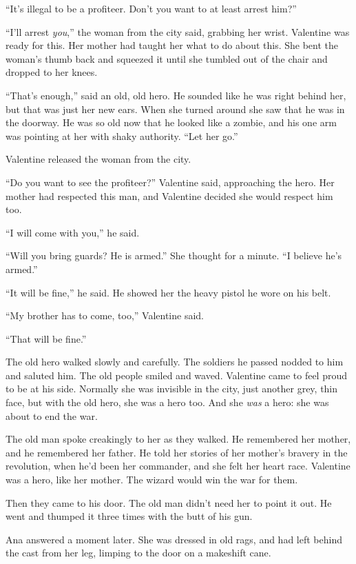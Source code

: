 “It’s illegal to be a profiteer. Don’t you want to at least arrest
him?”

“I’ll arrest \emph{you},” the woman from the city said, grabbing
her wrist. Valentine was ready for this. Her mother had taught her
what to do about this. She bent the woman’s thumb back and squeezed
it until she tumbled out of the chair and dropped to her knees.

“That’s enough,” said an old, old hero. He sounded like he was
right behind her, but that was just her new ears. When she turned
around she saw that he was in the doorway. He was so old now that
he looked like a zombie, and his one arm was pointing at her with
shaky authority. “Let her go.”

Valentine released the woman from the city.

“Do you want to see the profiteer?” Valentine said, approaching the
hero. Her mother had respected this man, and Valentine decided she
would respect him too.

“I will come with you,” he said.

“Will you bring guards? He is armed.” She thought for a minute. “I
believe he’s armed.”

“It will be fine,” he said. He showed her the heavy pistol he wore
on his belt.

“My brother has to come, too,” Valentine said.

“That will be fine.”

The old hero walked slowly and carefully. The soldiers he passed
nodded to him and saluted him. The old people smiled and waved.
Valentine came to feel proud to be at his side. Normally she was
invisible in the city, just another grey, thin face, but with the
old hero, she was a hero too. And she \emph{was} a hero: she was
about to end the war.

The old man spoke creakingly to her as they walked. He remembered
her mother, and he remembered her father. He told her stories of
her mother’s bravery in the revolution, when he’d been her
commander, and she felt her heart race. Valentine was a hero, like
her mother. The wizard would win the war for them.

Then they came to his door. The old man didn’t need her to point it
out. He went and thumped it three times with the butt of his gun.

Ana answered a moment later. She was dressed in old rags, and had
left behind the cast from her leg, limping to the door on a
makeshift cane.

